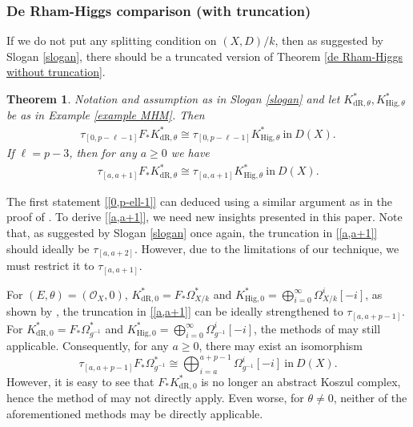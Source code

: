 \documentclass[12pt, a4paper]{article}
\newtheorem{theorem}{Theorem}[section]
\begin{document}
\subsubsection{De Rham-Higgs comparison (with truncation)}
If we do not put any splitting condition on $(X,D)/k$, then as suggested by Slogan \ref{slogan}, there should be a truncated version of Theorem \ref{de Rham-Higgs without truncation}. 
\begin{theorem}\label{two-sided truncation 0}
Notation and assumption as in Slogan \ref{slogan} and let $K^*_{\mathrm{dR},\theta},K^*_{\mathrm{Hig},\theta}$ be as in Example \ref{example MHM}. Then
\begin{eqnarray}\label{[0,p-ell-1]}
\tau_{[0,p-\ell-1]}F_*K^*_{\mathrm{dR},\theta}\cong\tau_{[0,p-\ell-1]}K^*_{\mathrm{Hig},\theta}~\mathrm{in}~D(X).
\end{eqnarray}
If $\ell=p-3$, then for any $a\geq0$ we have
\begin{eqnarray}\label{[a,a+1]}
 \tau_{[a,a+1]}F_*K^*_{\mathrm{dR},\theta}\cong\tau_{[a,a+1]}K^*_{\mathrm{Hig},\theta}~\mathrm{in}~D(X). 
\end{eqnarray}
\end{theorem}

The first statement \eqref{[0,p-ell-1]} can deduced using a similar argument as in the proof of \cite[Corollary 3.6]{SZ2}. To derive \eqref{[a,a+1]}, we need new insights presented in this paper. Note that, as suggested by Slogan \ref{slogan} once again, the truncation in \eqref{[a,a+1]} should ideally be \( \tau_{[a,a+2]} \). However, due to the limitations of our technique, we must restrict it to \( \tau_{[a,a+1]} \).

For $(E,\theta)=(\mathcal O_X,0)$, $K^*_{\mathrm{dR},0}=F_*\Omega^*_{X/k}$ and $K^*_{\mathrm{Hig},0}=\bigoplus_{i=0}^\infty\Omega^i_{X/k}[-i]$, as shown by \cite{AS,BL,LM,O24}, the truncation in \eqref{[a,a+1]} can be ideally strengthened to $\tau_{[a,a+p-1]}$. For $K^*_{\mathrm{dR},0}=F_*\Omega^*_{g^{-1}}$ and $K^*_{\mathrm{Hig},0}=\bigoplus_{i=0}^\infty \Omega^i_{g^{-1}}[-i]$, the methods of \cite{BL,LM,O24} may still applicable. Consequently, for any $a\geq0$, there may exist an isomorphism
$$
\tau_{[a,a+p-1]}F_*\Omega^*_{g^{-1}}\cong \bigoplus_{i=a}^{a+p-1} \Omega^i_{g^{-1}}[-i]~\mathrm{in}~D(X).
$$
However, it is easy to see that \( F_*K^*_{\mathrm{dR},0} \) is no longer an abstract Koszul complex, hence the method of \cite{AS} may not directly apply. Even worse, for \( \theta \neq 0 \), neither of the aforementioned methods may be directly applicable.  
 
\end{document}
